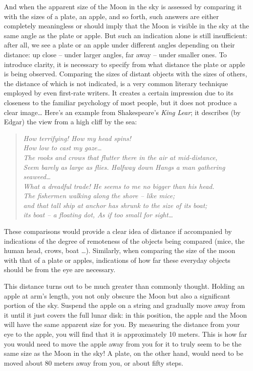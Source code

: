 And when the apparent size of the Moon in the sky is assessed by comparing it with the sizes of a plate, an apple, and so forth, such answers are either completely meaningless or should imply that the Moon is visible in the sky at the same angle as the plate or apple. But such an indication alone is still insufficient: after all, we see a plate or an apple under different angles depending on their distance: up close -- under larger angles, far away -- under smaller ones. To introduce clarity, it is necessary to specify from what distance the plate or apple is being observed. Comparing the sizes of distant objects with the sizes of others, the distance of which is not indicated, is a very common literary technique employed by even first-rate writers. It creates a certain impression due to its closeness to the familiar psychology of most people, but it does not produce a clear image\ldots{} Here's an example from Shakespeare's \emph{King Lear}; it describes (by Edgar) the view from a high cliff by the sea:
\begin{quote}
\emph{How terrifying! How my head spins!\\
How low to cast my gaze\ldots{}\\
The rooks and crows that flutter there in the air at mid-distance,\\ Seem barely as large as flies. Halfway down Hangs a man gathering seaweed\dots{} \\
What a dreadful trade! He seems to me no bigger than his head.\\
The fishermen walking along the shore -- like mice;\\
and that tall ship at anchor has shrunk to the size of its boat;\\ its boat -- a floating dot, As if too small for sight\dots{}}
\end{quote}
\clearpage
These comparisons would provide a clear idea of distance if accompanied by indications of the degree of remoteness of the objects being compared (mice, the human head, crows, boat \dots{}). Similarly, when comparing the size of the moon with that of a plate or apples, indications of how far these everyday objects should be from the eye are necessary.

This distance turns out to be much greater than commonly thought. Holding an apple at arm's length, you not only obscure the Moon but also a significant portion of the sky. Suspend the apple on a string and gradually move away from it until it just covers the full lunar disk: in this position, the apple and the Moon will have the same apparent size for you. By measuring the distance from your eye to the apple, you will find that it is approximately 10 meters. This is how far you would need to move the apple away from you for it to truly seem to be the same size as the Moon in the sky! A plate, on the other hand, would need to be moved about 80 meters away from you, or about fifty steps.

